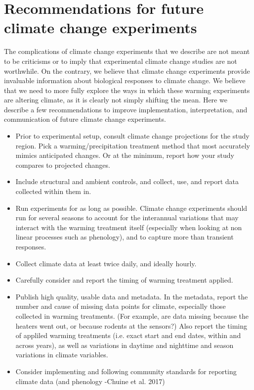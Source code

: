 \documentclass{article}
\begin{document}
\section {Recommendations for future climate change experiments}
 \par The complications of climate change experiments that  we describe are not meant to be criticisms or to imply that experimental climate change studies are not worthwhile. On the contrary, we believe that climate change experiments provide invaluable information about biological responses to climate change. We believe that we need to more fully explore the ways in which these warming experiments are altering climate, as it is clearly not simply shifting the mean. Here we describe a few recommendations to improve implementation, interpretation, and communication of future climate change experiments.
\begin{itemize}

\item Prior to experimental setup, consult climate change projections for the study region.  Pick a warming/precipitation treatment method that most accurately mimics anticipated changes. Or at the minimum, report how your study compares to projected changes.
\item Include structural and ambient controls, and collect, use, and report data collected within them in. 
\item Run experiments for as long as possible. Climate change experiments should run for several seasons to account for the interannual variations that may interact with the warming treatment itself (especially when looking at non linear processes such as phenology), and to capture more than transient responses.
 \item Collect climate data at least twice daily, and ideally hourly. 
\item Carefully consider and report the timing of warming treatment applied.
 \item Publish high quality, usable data and metadata. In the metadata, report the number and cause of missing data points for climate, especially those collected in warming treatments. (For example, are data missing because the heaters went out, or because rodents at the sensors?) Also report the timing of appliled warming treatments (i.e. exact start and end dates, within and across years), as well as variations in daytime and nighttime and season variations in climate variables. 
\item Consider implementing and following community standards for reporting climate data (and phenology -Chuine et al. 2017)

 \end{itemize}
\end{document}

